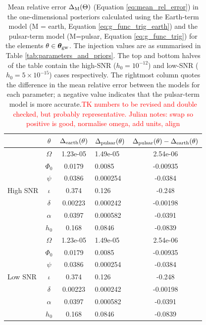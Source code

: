 \documentclass[fleqn,usenatbib,useAMS]{mnras}
\begin{document}
\begin{table}
	\centering
		\begin{tabular}{lcclc}
			\toprule
			&$\theta$ & $\Delta_{\rm earth}(\theta)$ & $\Delta_{\rm pulsar}(\theta)$ & $\Delta_{\rm pulsar}(\theta) -\Delta_{\rm earth}(\theta) $   \\
			\hline
			\multirow{7}{2mm}{High SNR} & $\Omega$       & 1.23e-05 &1.49e-05 &2.54e-06 \\
			& $\Phi_0$ &0.0179 &0.0085& -0.00935 \\
			& $\psi$ &0.0386& 0.000254& -0.0384 \\
			& $\iota$ & 0.374 &0.126 &-0.248 \\
			& $\delta$ & 0.00223 &0.000242& -0.00198 \\
			&$\alpha$ &0.0397 &0.000582 &-0.0391 \\
			&$h_0$ & 0.168 &0.0846 &-0.0839 \\
			\hline
			\multirow{7}{2mm}{Low SNR} & $\Omega$       & 1.23e-05 &1.49e-05 &2.54e-06 \\
			& $\Phi_0$ &0.0179 &0.0085& -0.00935 \\
			& $\psi$ &0.0386& 0.000254& -0.0384 \\
			& $\iota$ & 0.374 &0.126 &-0.248 \\
			& $\delta$ & 0.00223 &0.000242& -0.00198 \\
			&$\alpha$ &0.0397 &0.000582 &-0.0391 \\
			&$h_0$ & 0.168 &0.0846 &-0.0839 \\
			
			\bottomrule
		\end{tabular}
		\caption{Mean relative error $\Delta_{\rm M}(\Theta)$ (Equation \eqref{eq:mean_rel_error}) in the one-dimensional posteriors calculated using the Earth-term model (M = earth, Equation \eqref{eq:g_func_trig_earth}) and the pulsar-term model (M=pulsar, Equation \eqref{eq:g_func_trig}) for the elements $\theta \in \boldsymbol{\theta}_{\rm gw}$. The injection values are as summarised in Table \ref{tab:parameters_and_priors}. The top and bottom halves of the table contain the high-SNR ($h_0 = 10^{-12}$) and low-SNR ($h_0 = 5 \times 10^{-15}$) cases respectively. The rightmost column quotes the difference in the mean relative error between the models for each parameter; a negative value indicates that the pulsar-term model is more accurate.\textcolor{red}{TK numbers to be revised and double checked, but probably representative. Julian notes: swap so positive is good, normalise omega, add units, align}}
		\label{tab:posterior_errors}
	\end{table}
\end{document}
